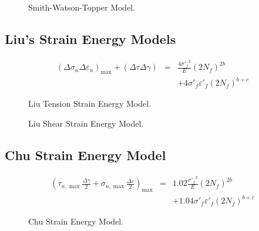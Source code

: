 \begin{figure}[!htp]
\caption{Smith-Watson-Topper Model.}
\label{Fig:NF-NP-TGMF-SWT}
\end{figure}

\subsection{Liu’s Strain Energy Models}
\begin{eqnarray*}
{\left( {\Delta {\sigma _n}\Delta {\varepsilon _n}} \right)_{\max }} + \left( {\Delta \tau \Delta \gamma } \right) &=& \frac{{4{{\sigma '}_f}^2}}{E}{\left( {2{N_f}} \right)^{2b}}
\\
& & + 4{{\sigma '}_f}{{\varepsilon '}_f}{\left( {2{N_f}} \right)^{b + c}}
\end{eqnarray*}
\begin{figure}[!htp]
\caption{Liu Tension Strain Energy Model.}
\label{Fig:NF-NP-TGMF-Liu1}
\end{figure}

\begin{figure}[!htp]
\caption{Liu Shear Strain Energy Model.}
\label{Fig:NF-NP-TGMF-Liu2}
\end{figure}

\subsection{Chu Strain Energy Model}

\begin{eqnarray*}
{\left( {{\tau _{n,\max }}\frac{{\Delta \gamma }}{2} + {\sigma _{n,\max }}\frac{{\Delta \varepsilon }}{2}} \right)_{\max }} &=& 1.02\frac{{{{\sigma '}_f}^2}}{E}{\left( {2{N_f}} \right)^{2b}} \\
&& + 1.04{{\sigma '}_f}{{\varepsilon '}_f}{\left( {2{N_f}} \right)^{b + c}}
\end{eqnarray*}

\begin{figure}[!htp]
\caption{Chu Strain Energy Model.}
\label{Fig:NF-NP-TGMF-Chu}
\end{figure}


